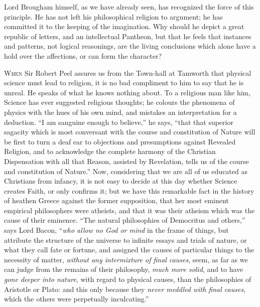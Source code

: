 Lord Brougham himself, as we have already seen, has recognized the
force of this principle. He has not left his philosophical religion to
argument; he has committed it to the keeping of the imagination. Why
should he depict a great republic of letters, and an intellectual
Pantheon, but that he feels that instances and patterns, not logical
reasonings, are the living conclusions which alone have a hold over
the affections, or can form the character?


W\textsc{hen} Sir Robert Peel assures us from the Town-hall at
Tamworth that physical science must lead to religion, it is no bad
compliment to him to say that he is unreal. He speaks of what he knows
nothing about. To a religious man like him, Science has ever suggested
religious thoughts; he colours the phenomena of physics with the hues
of his own mind, and mistakes an interpretation for a deduction.
``I am sanguine enough to believe,'' he says, ``that that
superior sagacity which is most conversant with the course and
constitution of Nature will be first to turn a deaf ear to objections
and presumptions against Revealed Religion, and to acknowledge the
complete harmony of the Christian Dispensation with all that Reason,
assisted by Revelation, tells us of the course and constitution of
Nature.'' Now, considering that we are all of us educated as
Christians from infancy, it is not easy to decide at this day whether
Science creates Faith, or only confirms it; but we have this
remarkable fact in the history of heathen Greece against the former
supposition, that her most eminent empirical philosophers were
atheists, and that it was their atheism which was the cause of their
eminence. ``The natural philosophies of Democritus and
others,'' says Lord Bacon, ``\emph{who allow no God or mind} in the
frame of things, but attribute the structure of the universe to infinite essays and trials of nature, or what they call fate or
fortune, and assigned the causes of particular things to the necessity
of matter, \emph{without any intermixture of final causes}, seem, as
far as we can judge from the remains of their philosophy, \emph{much more
solid}, and to have \emph{gone deeper into nature}, with regard to
physical causes, than the philosophies of Aristotle or Plato: and this
only because they \emph{never meddled with final causes}, which the
others were perpetually inculcating.''

